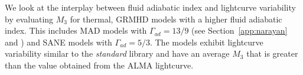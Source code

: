 We look at the interplay between fluid adiabatic index and lightcurve variability by evaluating $M_{3}$ for thermal, GRMHD models with a higher fluid adiabatic index. This includes MAD models with $\Gamma_{ad}=13/9$ (see Section~\ref{app:narayan} and  \citealt{2021arXiv210812380N}) and SANE models with $\Gamma_{ad}=5/3$. The models exhibit lightcurve variability similar to the \textit{standard} library and have an average $M_{3}$ that is greater than the value obtained from the ALMA lightcurve.
